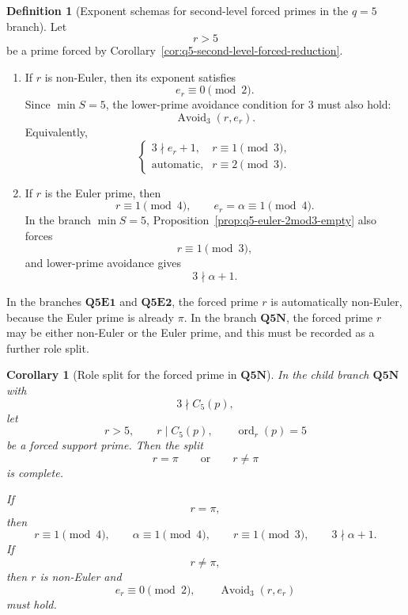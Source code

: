 \documentclass[11pt]{article}
\newtheorem{corollary}[theorem]{Corollary}
\theoremstyle{definition}
\newtheorem{definition}[theorem]{Definition}
\theoremstyle{remark}
\DeclareMathOperator{\ord}{ord}
\begin{document}
\begin{definition}[Exponent schemas for second-level forced primes in the \(q=5\) branch]
\label{def:q5-second-level-forced-prime-schemas}
Let
\[
  r>5
\]
be a prime forced by Corollary~\ref{cor:q5-second-level-forced-reduction}.

\begin{enumerate}[label=(\roman*),leftmargin=2.2em]

\item If \(r\) is non-Euler, then its exponent satisfies
      \[
        e_r\equiv0\pmod2.
      \]
      Since \(\min S=5\), the lower-prime avoidance condition for \(3\) must
      also hold:
      \[
        \operatorname{Avoid}_3(r,e_r).
      \]
      Equivalently,
      \[
        \begin{cases}
          3\nmid e_r+1, & r\equiv1\pmod3,\\[4pt]
          \text{automatic}, & r\equiv2\pmod3.
        \end{cases}
      \]

\item If \(r\) is the Euler prime, then
      \[
        r\equiv1\pmod4,
        \qquad
        e_r=\alpha\equiv1\pmod4.
      \]
      In the branch \(\min S=5\), Proposition~\ref{prop:q5-euler-2mod3-empty}
      also forces
      \[
        r\equiv1\pmod3,
      \]
      and lower-prime avoidance gives
      \[
        3\nmid \alpha+1.
      \]
\end{enumerate}

In the branches \(\mathbf{Q5E1}\) and \(\mathbf{Q5E2}\), the forced prime
\(r\) is automatically non-Euler, because the Euler prime is already \(\pi\).
In the branch \(\mathbf{Q5N}\), the forced prime \(r\) may be either non-Euler
or the Euler prime, and this must be recorded as a further role split.
\end{definition}

\begin{corollary}[Role split for the forced prime in \(\mathbf{Q5N}\)]
\label{cor:q5n-forced-prime-role-split}
In the child branch \(\mathbf{Q5N}\) with
\[
  3\nmid C_5(p),
\]
let
\[
  r>5,
  \qquad
  r\mid C_5(p),
  \qquad
  \ord_r(p)=5
\]
be a forced support prime.  Then the split
\[
  r=\pi
  \qquad\text{or}\qquad
  r\ne\pi
\]
is complete.

If
\[
  r=\pi,
\]
then
\[
  r\equiv1\pmod4,
  \qquad
  \alpha\equiv1\pmod4,
  \qquad
  r\equiv1\pmod3,
  \qquad
  3\nmid\alpha+1.
\]
If
\[
  r\ne\pi,
\]
then \(r\) is non-Euler and
\[
  e_r\equiv0\pmod2,
  \qquad
  \operatorname{Avoid}_3(r,e_r)
\]
must hold.
\end{corollary}
\end{document}

